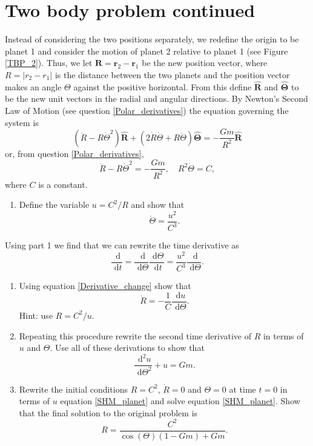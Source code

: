 \documentclass[]{article}
\newcounter{ItemCounter}
\newcommand{\bb}{\begin{equation}}
\newcommand{\ee}{\end{equation}}
\newcommand{\rd}{\text{ d}}
\newcommand{\see}[1]{(see Figure \ref{#1})}
\newcommand{\eqn}[1]{equation \eqref{#1}}
\renewcommand{\l}{\left(}
\renewcommand{\r}{\right)}
\begin{document}
\section{Two body problem continued}\label{Two body problem continued}
Instead of considering the two positions separately, we redefine the origin to be planet 1 and consider the motion of planet 2 relative to planet 1 \see{TBP_2}. Thus, we let $\bm{R}=\bm{r}_2-\bm{r}_1$ be the new position vector, where $R=|r_2-r_1|$ is the distance between the two planets and the position vector makes an angle $\Theta$ against the positive horizontal. From this define $\hat{\bm{R}}$ and $\hat{\bm{\Theta}}$ to be the new unit vectors in the radial and angular directions. By Newton's Second Law of Motion (see question \ref{Polar_derivatives}) the equation governing the system is
\bb
\l \ddot{R}-R\dot{\Theta}^2\r\hat{\bm{R}}+\l 2\dot{R}\dot{\Theta}+R\ddot{\Theta}\r\hat{\bm{\Theta}}=-\frac{Gm}{R^2}\hat{\bm{R}}
\ee
or, from question \ref{Polar_derivatives},
\bb
\ddot{R}-R\dot{\Theta}^2=-\frac{Gm}{R^2},\quad R^2\dot{\Theta}=C,
\ee
where $C$ is a constant.
\begin{enumerate}
\item Define the variable $u=C^2/R$ and show that
\bb
\dot{\Theta}=\frac{u^2}{C^3}.
\ee
\setcounter{ItemCounter}{\value{enumi}}
\end{enumerate}
\noindent Using part 1 we find that we can rewrite the time derivative as
\bb
\frac{\rd }{\rd t}=\frac{\rd }{\rd \Theta}\frac{\rd \Theta}{\rd t}=\frac{u^2}{C^3}\frac{\rd }{\rd \Theta}.\label{Derivative_change}
\ee
\begin{enumerate}
\setcounter{enumi}{\value{ItemCounter}}
\item Using \eqn{Derivative_change} show that
\bb
\dot{R}=-\frac{1}{C}\frac{\rd u}{\rd \Theta}.
\ee
Hint: use $R= C^2/u$.
\item Repeating this procedure rewrite the second time derivative of $R$ in terms of $u$ and $\Theta$. Use all of these derivations to show that
\bb
\frac{\rd^2 u}{\rd \Theta^2}+u=Gm.\label{SHM_planet}
\ee
\item Rewrite the initial conditions $R=C^2$, $\dot{R}=0$ and $\Theta=0$ at time $t=0$ in terms of $u$ \eqn{SHM_planet} and solve \eqn{SHM_planet}. Show that the final solution to the original problem is
\bb
R=\frac{C^2}{\cos(\Theta)(1-Gm)+Gm}.
\ee
\end{enumerate}
\end{document}

